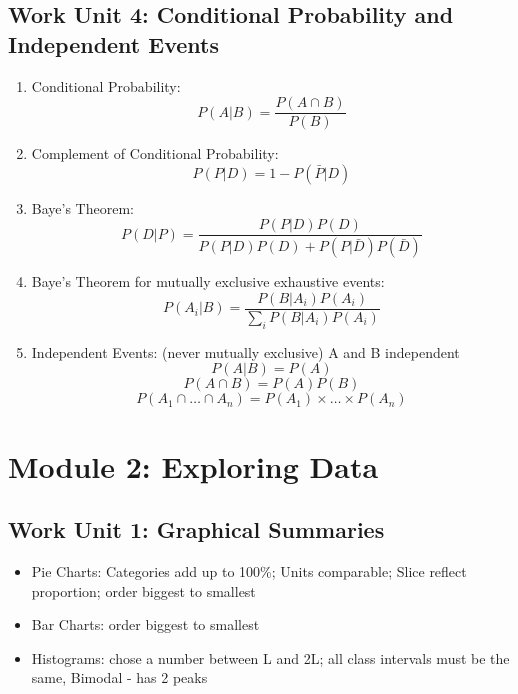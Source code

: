 \documentclass[a4paper,10pt]{article}
\begin{document}
\subsection{Work Unit 4: Conditional Probability and Independent Events}
\begin{enumerate}
	\item Conditional Probability: \[ P(A|B) = \frac{P(A\cap B)}{P(B)} \]
	\item Complement of Conditional Probability: \[ P(P|D) = 1-P(\bar{P}|D) \]
	\item Baye's Theorem: \[ P(D|P) = \frac{P(P|D)P(D)}{P(P|D)P(D)+P(P|\bar{D})P(\bar{D})} \]
	\item Baye's Theorem for mutually exclusive exhaustive events: \[ P(A_i|B) = \frac{P(B|A_i)P(A_i)}{\sum_i P(B|A_i)P(A_i)} \]
	\item Independent Events: (never mutually exclusive) A and B independent \[ P(A|B) = P(A) \] \[ P(A\cap B) = P(A)P(B) \] \[P(A_1\cap \ldots \cap A_n) = P(A_1)\times \ldots \times P(A_n)\]
\end{enumerate}

\section{Module 2: Exploring Data}
\subsection{Work Unit 1: Graphical Summaries}

\begin{itemize}
	\item Pie Charts: Categories add up to 100\%; Units comparable; Slice reflect proportion; order biggest to smallest
	\item Bar Charts: order biggest to smallest
	\item Histograms: chose a number between L and 2L; all class intervals must be the same, Bimodal - has 2 peaks
\end{itemize}
\end{document}
